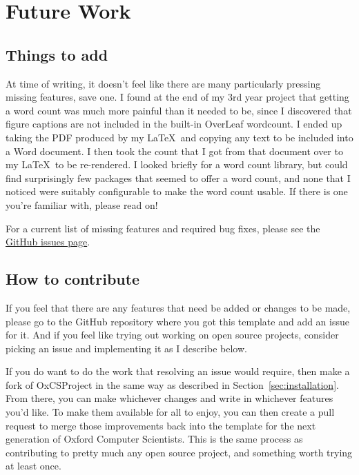 \section{Future Work}
\label{sec:future_work}

\subsection{Things to add}

At time of writing, it doesn't feel like there are many particularly pressing missing features,
save one. I found at the end of my 3rd year project that getting a word count was much more
painful than it needed to be, since I discovered that figure captions are not included in the
built-in OverLeaf wordcount. I ended up taking the PDF produced by my \LaTeX\ and copying any text
to be included into a Word document. I then took the count that I got from that document over to
my \LaTeX\ to be re-rendered. I looked briefly for a word count library, but could find
surprisingly few packages that seemed to offer a word count, and none that I noticed were suitably
configurable to make the word count usable. If there is one you're familiar with, please read on!

For a current list of missing features and required bug fixes, please see the
\href{https://github.com/Ned-Stevenson/OxCSProject/issues}{GitHub issues page}.

\subsection{How to contribute}

If you feel that there are any features that need be added or changes to be made, please go to the
GitHub repository where you got this template and add an issue for it. And if you feel like trying
out working on open source projects, consider picking an issue and implementing it as I describe
below.

If you do want to do the work that resolving an issue would require, then make a fork of
OxCSProject in the same way as described in Section~\ref{sec:installation}. From there, you can
make whichever changes and write in whichever features you'd like. To make them available for all
to enjoy, you can then create a pull request to merge those improvements back into the template
for the next generation of Oxford Computer Scientists. This is the same process as contributing to
pretty much any open source project, and something worth trying at least once.
